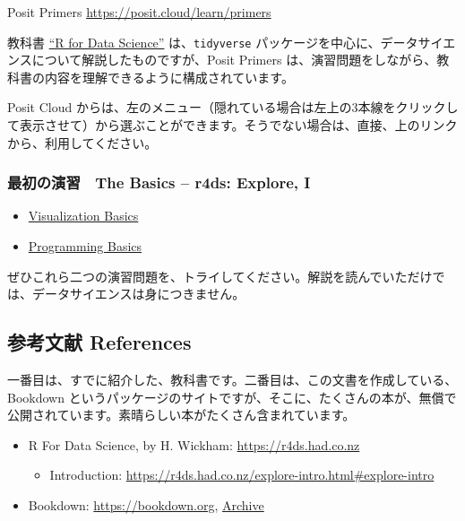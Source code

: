 \documentclass[
]{bxjsbook}
\providecommand{\tightlist}{%
  \setlength{\itemsep}{0pt}\setlength{\parskip}{0pt}}
\theoremstyle{definition}
\theoremstyle{definition}
\theoremstyle{definition}
\theoremstyle{definition}
\theoremstyle{remark}
\begin{document}
Posit Primers \url{https://posit.cloud/learn/primers}

教科書 \href{https://r4ds.had.co.nz}{``R for Data Science''} は、\texttt{tidyverse} パッケージを中心に、データサイエンスについて解説したものですが、Posit Primers は、演習問題をしながら、教科書の内容を理解できるように構成されています。

Posit Cloud からは、左のメニュー（隠れている場合は左上の3本線をクリックして表示させて）から選ぶことができます。そうでない場合は、直接、上のリンクから、利用してください。

\hypertarget{ux6700ux521dux306eux6f14ux7fd2-the-basics-r4ds-explore-i}{%
\subsubsection{最初の演習　The Basics -- r4ds: Explore, I}\label{ux6700ux521dux306eux6f14ux7fd2-the-basics-r4ds-explore-i}}

\begin{itemize}
\tightlist
\item
  \href{https://rstudio.cloud/learn/primers/1.1}{Visualization Basics}
\item
  \href{https://rstudio.cloud/learn/primers/1.2}{Programming Basics}
\end{itemize}

ぜひこれら二つの演習問題を、トライしてください。解説を読んでいただけでは、データサイエンスは身につきません。

\hypertarget{ux53c2ux8003ux6587ux732e-references}{%
\subsection{参考文献 References}\label{ux53c2ux8003ux6587ux732e-references}}

一番目は、すでに紹介した、教科書です。二番目は、この文書を作成している、Bookdown というパッケージのサイトですが、そこに、たくさんの本が、無償で公開されています。素晴らしい本がたくさん含まれています。

\begin{itemize}
\tightlist
\item
  R For Data Science, by H. Wickham: \url{https://r4ds.had.co.nz}

  \begin{itemize}
  \tightlist
  \item
    Introduction: \url{https://r4ds.had.co.nz/explore-intro.html\#explore-intro}
  \end{itemize}
\item
  Bookdown: \url{https://bookdown.org}, \href{https://bookdown.org/home/archive/}{Archive}
\end{itemize}
\end{document}
